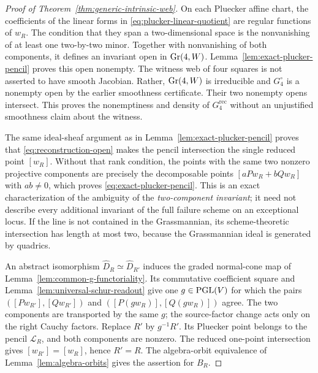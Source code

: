 \begin{proof}[Proof of Theorem~\ref{thm:generic-intrinsic-web}]
On each Pluecker affine chart, the coefficients of the linear forms
in \eqref{eq:plucker-linear-quotient} are regular functions of
\(w_R\).  The condition that they span a two-dimensional space
is the nonvanishing of at least one two-by-two minor.  Together with
nonvanishing of both components, it defines an invariant open in
\(\operatorname{Gr}(4,W)\).  Lemma~\ref{lem:exact-plucker-pencil} proves this
open nonempty.  The witness web of four squares is not asserted to
have smooth Jacobian.  Rather, \(\operatorname{Gr}(4,W)\) is irreducible and
\(G_4^\circ\) is a nonempty open by the earlier smoothness
certificate.  Their two nonempty opens intersect.  This proves the
nonemptiness and density of \(G_4^{\mathrm{rec}}\) without an
unjustified smoothness claim about the witness.

The same ideal-sheaf argument as in
Lemma~\ref{lem:exact-plucker-pencil} proves that
\eqref{eq:reconstruction-open} makes the pencil intersection the
single reduced point \([w_R]\).  Without that rank condition,
the points with the same two nonzero projective components are
precisely the decomposable points \([aPw_R+bQw_R]\) with
\(ab\ne0\), which proves \eqref{eq:exact-plucker-pencil}.
This is an exact characterization of the ambiguity of the
\emph{two-component invariant}; it need not describe every
additional invariant of the full failure scheme on an exceptional
locus.  If the line is not contained in the Grassmannian, its
scheme-theoretic intersection has length at most two, because the
Grassmannian ideal is generated by quadrics.

An abstract isomorphism \(\widehat D_R\simeq\widehat D_{R'}\)
induces the graded normal-cone map of
Lemma~\ref{lem:common-g-functoriality}.  Its commutative coefficient
square and Lemma~\ref{lem:universal-schur-readout} give one
\(g\in\operatorname{PGL}(V)\) for which the pairs
\(([Pw_{R'}],[Qw_{R'}])\) and
\(([P(gw_R)],[Q(gw_R)])\) agree.  The two components are
transported by the same \(g\); the source-factor change acts only
on the right Cauchy factors.  Replace \(R'\) by
\(g^{-1}R'\).  Its Pluecker point belongs to the pencil
\(\mathscr L_R\), and both components are nonzero.  The reduced
one-point intersection gives \([w_{R'}]=[w_R]\), hence
\(R'=R\).  The algebra-orbit equivalence of
Lemma~\ref{lem:algebra-orbits} gives the assertion for \(B_R\).
\end{proof}

